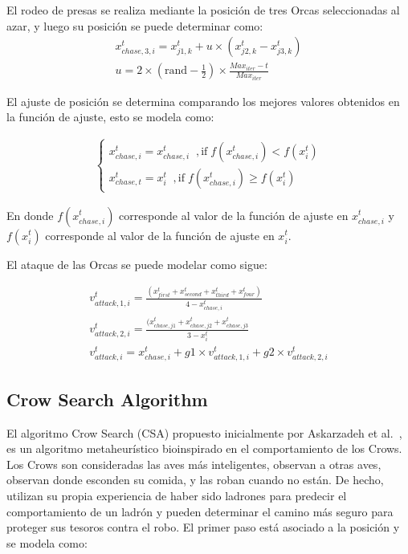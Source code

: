 \documentclass[conference]{IEEEtran}
\begin{document}
\noindent El rodeo de presas se realiza mediante la posición de tres Orcas seleccionadas al azar, y luego su posición se puede determinar como:
\begin{equation}
	\begin{gathered}
		x_{chase,3,i}^t =x_{j1,k}^t +u \times (x_{j2,k}^t - x_{j3,k}^t ) \\
		u = 2 \times (\text{rand} - \frac{1}{2}) \times \frac{Max_{iter}-t}{Max_{iter}}
	\end{gathered}
	\label{eq20}
\end{equation}

\noindent El ajuste de posición se determina comparando los mejores valores obtenidos en la función de ajuste, esto se modela como:

\begin{equation}
	\begin{gathered}
		\begin{cases}
			x_{chase,i}^t = x_{chase,i}^t \;\;, \text{if} \; f(x_{chase,i}^t) < f(x_{i}^t ) \\
			x_{chase,t}^t = x_{i}^t  \;\;, \text{if} \;f(x_{chase,i}^t) \geq f(x_{i}^t )    
		\end{cases}
	\end{gathered}
	\label{eq21}
\end{equation}

\noindent En donde $f(x_{chase,i}^t)$ corresponde al valor de la función de ajuste en $x_{chase,i}^t$ y $f(x_{i}^t )$ corresponde al valor de la función de ajuste en $x_{i}^t$.

El ataque de las Orcas se puede modelar como sigue:

\begin{equation}
	\begin{gathered}
		v_{attack,1,i}^t = \frac{(x_{first}^t+x_{second}^t + x_{third}^t + x_{four}^t)}{4-x_{chase,i}^t} \\
		v_{attack,2,i}^t = \frac{(x_{chase,j1}^t+x_{chase,j2}^t + x_{chase,j3}^t}{3-x_{i}^t}  \\
		v_{attack,i}^t = x_{chase,i}^t+ g1 \times v_{attack,1,i}^t + g2 \times v_{attack,2,i}^t
	\end{gathered}
	\label{eq22}
\end{equation}

\subsection{Crow Search Algorithm}

\noindent El algoritmo Crow Search (CSA) propuesto inicialmente por Askarzadeh et al.~\cite{Askarzadeh2016}, es un algoritmo metaheurístico bioinspirado en el comportamiento de los Crows. Los Crows son consideradas las aves más inteligentes, observan a otras aves, observan donde esconden su comida, y las roban cuando no están. De hecho, utilizan su propia experiencia de haber sido ladrones para predecir el comportamiento de un ladrón y pueden determinar el camino más seguro para proteger sus tesoros contra el robo. El primer paso está asociado a la posición y se modela como:
\end{document}
